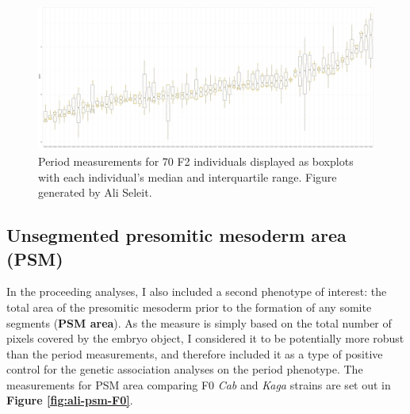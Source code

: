 \documentclass[
]{book}
\begin{document}
\begin{figure}
\includegraphics[width=1\linewidth]{figs/somites/ali_F2_mean_period} \caption{Period measurements for 70 F2 individuals displayed as boxplots with each individual's median and interquartile range. Figure generated by Ali Seleit.}\label{fig:ali-somite-period-box}
\end{figure}

\hypertarget{unsegmented-presomitic-mesoderm-area-psm}{%
\subsection{Unsegmented presomitic mesoderm area (PSM)}\label{unsegmented-presomitic-mesoderm-area-psm}}

In the proceeding analyses, I also included a second phenotype of interest: the total area of the presomitic mesoderm prior to the formation of any somite segments (\textbf{PSM area}). As the measure is simply based on the total number of pixels covered by the embryo object, I considered it to be potentially more robust than the period measurements, and therefore included it as a type of positive control for the genetic association analyses on the period phenotype. The measurements for PSM area comparing F0 \emph{Cab} and \emph{Kaga} strains are set out in \textbf{Figure \ref{fig:ali-psm-F0}}.
\end{document}
